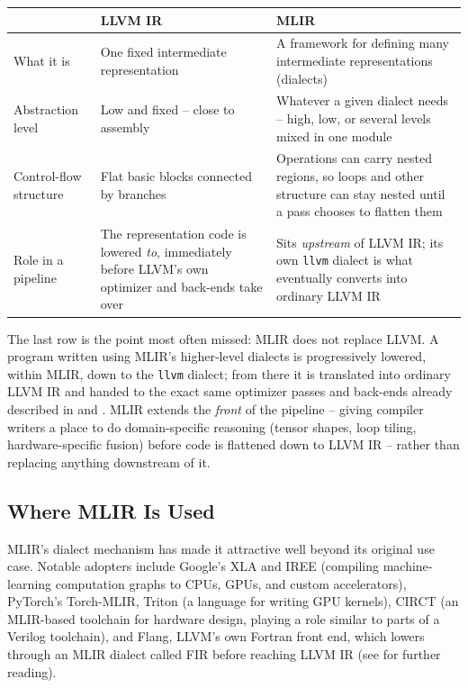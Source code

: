 \documentclass[full-course-notes.tex]{subfiles}
\begin{document}
\begin{center}
\renewcommand{\arraystretch}{1.4}
\begin{tabularx}{\textwidth}{@{}l X X@{}}
\toprule
 & \textbf{LLVM IR} & \textbf{MLIR} \\
\midrule
What it is & One fixed intermediate representation & A framework for defining many
intermediate representations (dialects) \\
Abstraction level & Low and fixed -- close to assembly & Whatever a given dialect needs --
high, low, or several levels mixed in one module \\
Control-flow structure & Flat basic blocks connected by branches & Operations can carry nested
regions, so loops and other structure can stay nested until a pass chooses to flatten them \\
Role in a pipeline & The representation code is lowered \emph{to}, immediately before
LLVM's own optimizer and back-ends take over & Sits \emph{upstream} of LLVM IR; its own
\texttt{llvm} dialect is what eventually converts into ordinary LLVM IR \\
\bottomrule
\end{tabularx}
\end{center}

The last row is the point most often missed: MLIR does not replace LLVM. A program written using
MLIR's higher-level dialects is progressively lowered, within MLIR, down to the \texttt{llvm}
dialect; from there it is translated into ordinary LLVM IR and handed to the exact same
optimizer passes and back-ends already described in  and
. MLIR extends the \emph{front}
of the pipeline -- giving compiler writers a place to do domain-specific reasoning (tensor
shapes, loop tiling, hardware-specific fusion) before code is flattened down to LLVM IR -- rather
than replacing anything downstream of it.

\subsection{Where MLIR Is Used}
\label{sec:l2-mlir-adopters}

MLIR's dialect mechanism has made it attractive well beyond its original use case. Notable
adopters include Google's XLA and IREE (compiling machine-learning computation graphs to CPUs,
GPUs, and custom accelerators), PyTorch's Torch-MLIR, Triton (a language for writing GPU
kernels), CIRCT (an MLIR-based toolchain for hardware design, playing a role similar to parts of
a Verilog toolchain), and Flang, LLVM's own Fortran front end, which lowers through an
MLIR dialect called FIR before reaching LLVM IR (see \cite{mlir,mlirdocs} for further reading).
\end{document}
